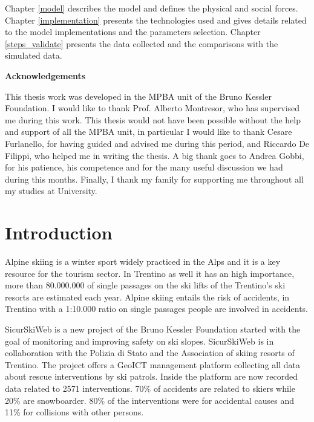 \documentclass[12pt,a4paper,twoside]{book}
\makeatletter
\newcommand\ackname{Acknowledgements}
\newenvironment{acknowledgements}{%
      \titlepage
      \null\vfil
      \@beginparpenalty\@lowpenalty
      \begin{center}%
        \bfseries \ackname
        \@endparpenalty\@M
      \end{center}}%
     {\par\vfil\null\endtitlepage}
\newenvironment{acknowledgements}{%
      \if@twocolumn
        \section*{\abstractname}%
      \else
        \small
        \begin{center}%
          {\bfseries \ackname\vspace{-.5em}\vspace{\z@}}%
        \end{center}%
        \quotation
      \fi}
      {\if@twocolumn\else\endquotation\fi}
\makeatother
\begin{document}
Chapter \ref{model} describes the model and defines the physical and social forces. Chapter \ref{implementation} presents the technologies used and gives details related to the model implementations and the parameters selection. Chapter \ref{steps_validate} presents the data collected and the comparisons with the simulated data.

\begin{acknowledgements}
This thesis work was developed in the MPBA unit of the Bruno Kessler Foundation. I would like to thank Prof. Alberto Montresor, who has supervised me during this work. This thesis would not have been possible without the help and support of all the MPBA unit, in particular I would like to thank Cesare Furlanello, for having guided and advised me during this period, and Riccardo De Filippi, who helped me in writing the thesis. A big thank goes to Andrea Gobbi, for his patience, his competence and for the many useful discussion we had during this months. Finally, I thank my family for supporting me throughout all my studies at University.
\end{acknowledgements}

\tableofcontents

\chapter*{Introduction}
Alpine skiing is a winter sport widely practiced in the Alps and it is a key resource for the tourism sector. In Trentino as well it has an high importance, more than 80.000.000 of single passages on the ski lifts of the Trentino's ski resorts are estimated each year. Alpine skiing entails the risk of accidents, in Trentino with a 1:10.000 ratio on single passages people are involved in accidents.

SicurSkiWeb is a new project of the Bruno Kessler Foundation started with the goal of monitoring and improving safety on ski slopes. SicurSkiWeb is in collaboration with the Polizia di Stato and the Association of skiing resorts of Trentino. The project offers a GeoICT management platform collecting all data about rescue interventions by ski patrols. Inside the platform are now recorded data related to 2571 interventions. 70\% of accidents are related to skiers while 20\% are snowboarder. 80\% of the interventions were for accidental causes and 11\% for collisions with other persons.
\end{document}
